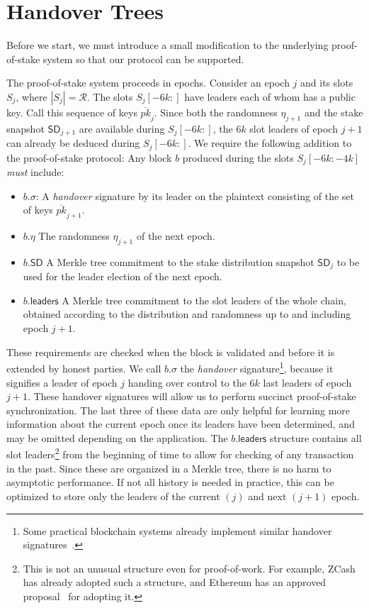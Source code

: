 \section{Handover Trees}\label{sec.handover}

Before we start, we must introduce a small modification to the underlying proof-of-stake system
so that our protocol can be supported.

The proof-of-stake system proceeds in epochs. Consider an epoch $j$ and its slots
$S_j$, where $|S_j| = \mathcal{R}$. The slots
$S_j[-6k{:}]$ have leaders each of whom has
a public key. Call this sequence of keys $\overline{pk}_j$.
Since both the randomness $\eta_{j+1}$ and the stake
snapshot $\textsf{SD}_{j+1}$ are available during $S_j[-6k{:}]$, the $6k$ slot
leaders of epoch $j+1$ can already be deduced during $S_j[-6k{:}]$.
We require the following addition to the proof-of-stake protocol: Any block $b$
produced during the slots $S_j[-6k{:}-4k]$ \emph{must} include:

\begin{itemize}
  \item $b.\sigma$: A \emph{handover} signature by its leader on the plaintext consisting
        of the set of keys $\overline{pk}_{j+1}$.
  \item $b.\eta$ The randomness $\eta_{j+1}$ of the next epoch.
  \item $b\textsf{.SD}$ A Merkle tree commitment to the stake distribution snapshot $\mathsf{SD}_j$ to be used
        for the leader election of the next epoch.
  \item $b\textsf{.leaders}$ A Merkle tree commitment to the slot leaders of the whole chain,
        obtained according to the distribution and randomness up to and including
        epoch $j+1$.
\end{itemize}

These requirements are checked when the block is validated and before it is
extended by honest parties. We call $b.\sigma$
the \emph{handover} signature\footnote{Some practical blockchain systems
already implement similar handover signatures~\cite{nearbridge,horizon}.},
because it signifies a leader of epoch $j$ handing over
control to the $6k$ last leaders of epoch $j+1$.
These handover signatures will allow us to perform succinct proof-of-stake
synchronization. The last three of these data are only helpful for learning
more information about the current epoch once its leaders have been determined,
and may be omitted depending on the application. The $b\textsf{.leaders}$
structure contains all slot leaders\footnote{This is not an unusual structure
even for proof-of-work. For example, ZCash has already adopted such a structure,
and Ethereum has an approved proposal~\cite{eip210} for adopting it.}
from the beginning of time to allow for
checking of any transaction in the past. Since these are organized in a Merkle tree,
there is no harm to asymptotic performance.  If not all history is needed in practice,
this can be optimized to store only the leaders of the current $(j)$ and next $(j+1)$
epoch.

